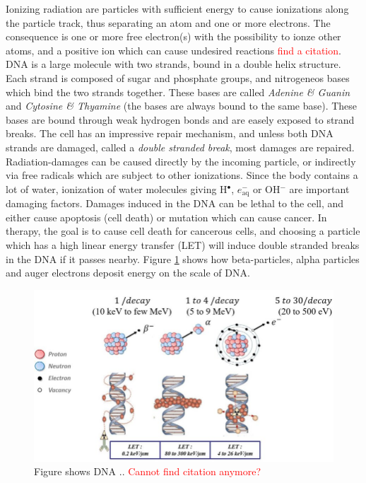 \documentclass[a4paper,11pt,twoside]{book}
\begin{document}
Ionizing radiation are particles with sufficient energy to cause ionizations along the particle track, thus separating an atom and one or more electrons. The consequence is one or more free electron(s) with the possibility to ionze other atoms, and a positive ion which can cause undesired reactions \textcolor{red}{find a citation}. DNA is a large molecule with two strands, bound in a double helix structure. Each strand is composed of sugar and phosphate groups, and nitrogeneos bases which bind the two strands together. These bases are called \textit{Adenine \& Guanin} and \textit{Cytosine \& Thyamine} (the  bases are always bound to the same base). These bases are bound through weak hydrogen bonds and are easely exposed to strand breaks. The cell has an impressive repair mechanism, and unless both DNA strands are damaged, called a \textit{double stranded break}, most damages are repaired. Radiation-damages can be caused directly by the incoming particle, or indirectly via free radicals which are subject to other ionizations. Since the body contains a lot of water, ionization of water molecules giving H$^\bullet$, $e_\text{aq}^-$ or OH$^-$ are important damaging factors. Damages induced in the DNA can be lethal to the cell, and either cause apoptosis (cell death) or mutation which can cause cancer. In therapy, the goal is to cause cell death for cancerous cells, and choosing a particle which has a high linear energy transfer (LET) will induce double stranded breaks in the DNA if it passes nearby. Figure \ref{fig:DNA_damage} shows how beta-particles, alpha particles and auger electrons deposit energy on the scale of DNA.  \\

\begin{figure}
	\centering
	\includegraphics[scale=1]{Theory/DNA_LET.jpg} 
	\caption{Figure shows DNA .. \textcolor{red}{Cannot find citation anymore?} }
	\label{fig:DNA_damage}
\end{figure}
\end{document}
